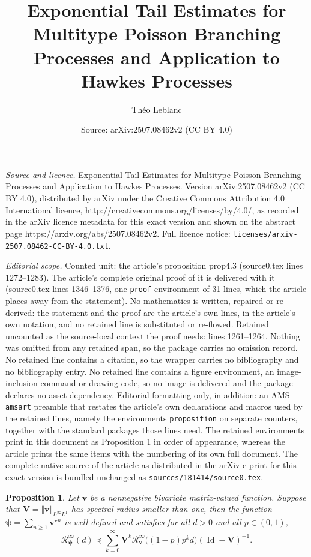 \documentclass[10pt,a4paper]{amsart}
\title{Exponential Tail Estimates for Multitype Poisson Branching Processes and Application to Hawkes Processes}
\author{Th\'eo Leblanc}
\date{Source: arXiv:2507.08462v2 (CC BY 4.0)}
\newtheorem{proposition}{Proposition}
\DeclareMathOperator{\Id}{Id}
\newcommand{\Res}{\mathcal{R}}
\newcommand{\Vityone}[1]{\Vert #1 \Vert_{L^{\infty}L^{1}}}
\begin{document}
\maketitle

\noindent\emph{Source and licence.} Exponential Tail Estimates for Multitype Poisson Branching Processes and Application to Hawkes Processes. Version arXiv:2507.08462v2 (CC BY 4.0), distributed by arXiv under the Creative Commons Attribution 4.0 International licence, http://creativecommons.org/licenses/by/4.0/, as recorded in the arXiv licence metadata for this exact version and shown on the abstract page https://arxiv.org/abs/2507.08462v2. Full licence notice: \texttt{licenses/arxiv-2507.08462-CC-BY-4.0.txt}.\par\smallskip

\noindent\textit{Editorial scope.} Counted unit: the article's proposition prop4.3 (source0.tex lines 1272--1283). The article's complete original proof of it is delivered with it (source0.tex lines 1346--1376, one \texttt{proof} environment of 31 lines, which the article places away from the statement). No mathematics is written, repaired or re-derived: the statement and the proof are the article's own lines, in the article's own notation, and no retained line is substituted or re-flowed.  Retained uncounted as the source-local context the proof needs: lines 1261--1264.  Nothing was omitted from any retained span, so the package carries no omission record.  No retained line contains a citation, so the wrapper carries no bibliography and no bibliography entry.  No retained line contains a figure environment, an image-inclusion command or drawing code, so no image is delivered and the package declares no asset dependency.  Editorial formatting only, in addition: an AMS \texttt{amsart} preamble that restates the article's own declarations and macros used by the retained lines, namely the environments \texttt{proposition} on separate counters, together with the standard packages those lines need.  The retained environments print in this document as Proposition 1 in order of appearance, whereas the article prints the same items with the numbering of its own full document.  The complete native source of the article as distributed in the arXiv e-print for this exact version is bundled unchanged as \texttt{sources/181414/source0.tex}.
\begin{proposition}\label{prop4.2}
	Let $\bm{v}$ be a nonnegative bivariate matrix-valued function. Suppose that $\bm{V} =\Vityone{\bm{v}}$ has spectral radius smaller than one, then the function $\bm{\psi} = \sum_{n\geq 1} \bm{v}^{\star n}$ is well defined and satisfies for all $d>0$ and all $p\in(0,1)$,
	\[\Res_{\bm{\psi}}^{\infty}(d) \preceq \sum_{k=0}^{\infty} \bm{V}^k \Res_{\bm{v}}^{\infty}\big((1-p)p^k d\big) (\Id-\bm{V})^{-1}. \]  
\end{proposition}
\end{document}
